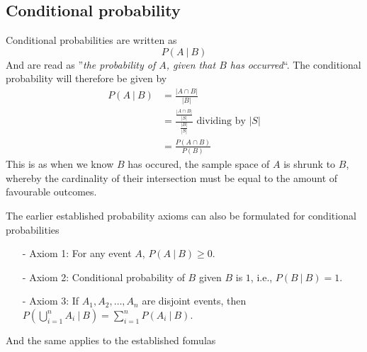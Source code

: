 \subsection{Conditional probability}
Conditional probabilities are written as
\[
    P(A~|~B)
\]
And are read as ''\textit{the probability of $A$, given that $B$ has occurred}``. The conditional probability will therefore be given by
\begin{align*}
    P(A~|~B)&=\frac{|A\cap B|}{|B|} \\
            &=\frac{\frac{|A\cap B|}{|S|}}{\frac{|B|}{|S|}} \text{ dividing by $|S|$} \\
            &=\frac{P(A\cap B)}{P(B)}
\end{align*}
This is as when we know $B$ has occured, the sample space of $A$ is shrunk to $B$, whereby the cardinality of their intersection must be equal to the amount of favourable outcomes.

The earlier established probability axioms can also be formulated for conditional probabilities
\begin{itemize}
    \item[-] Axiom 1: For any event $A$, $P(A~|~B)\geq 0$.
    \item[-] Axiom 2: Conditional probability of $B$ given $B$ is $1$, i.e., $P(B~|~B)=1$.
    \item[-] Axiom 3: If $A_{1},A_{2},\ldots,A_{n}$ are disjoint events, then $P(\bigcup_{i=1}^{n}A_{i}~|~B)=\sum_{i=1}^{n} P(A_{i}~|~B)$.
\end{itemize}
And the same applies to the established fomulas

